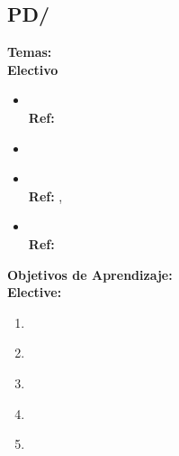 \subsection{PD/\PDCloudComputing}\label{sec:BOK:PDCloudComputing}
\noindent \textbf{Temas:}\\
\noindent \textbf{Electivo}
\begin{itemize}
	\item \PDCloudComputingTopicInternet\xspace \\ \textbf{Ref:} \label{sec:BOK:PDCloudComputingTopicInternet}
	\item \PDCloudComputingTopicCloud\label{sec:BOK:PDCloudComputingTopicCloud}
	\item \PDCloudComputingTopicVirtualization\xspace \\ \textbf{Ref:} , \label{sec:BOK:PDCloudComputingTopicVirtualization}
	\item \PDCloudComputingTopicCloudBased\xspace \\ \textbf{Ref:} \label{sec:BOK:PDCloudComputingTopicCloudBased}
\end{itemize}


\noindent \textbf{Objetivos de Aprendizaje:}\\
\noindent \textbf{Elective:}
\begin{enumerate}
	\setcounter{enumi}{0}
	\item \PDCloudComputingLODiscussTheElasticity\xspace[\PDCloudComputingLODiscussTheElasticityLevel]\label{sec:BOK:PDCloudComputingLODiscussTheElasticity}
	\item \PDCloudComputingLOExplainStrategies\xspace[\PDCloudComputingLOExplainStrategiesLevel]\label{sec:BOK:PDCloudComputingLOExplainStrategies}
	\item \PDCloudComputingLOExplainTheDisadvantages\xspace[\PDCloudComputingLOExplainTheDisadvantagesLevel]\label{sec:BOK:PDCloudComputingLOExplainTheDisadvantages}
	\item \PDCloudComputingLODeploy\xspace[\PDCloudComputingLODeployLevel]\label{sec:BOK:PDCloudComputingLODeploy}
	\item \PDCloudComputingLOAppropriately\xspace[\PDCloudComputingLOAppropriatelyLevel]\label{sec:BOK:PDCloudComputingLOAppropriately}
\end{enumerate}


